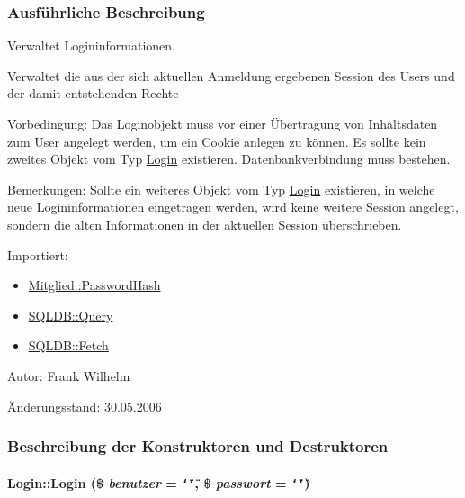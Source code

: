 \subsubsection{Ausf\"{u}hrliche Beschreibung}
Verwaltet Logininformationen. 

Verwaltet die aus der sich aktuellen Anmeldung ergebenen Session des Users und der damit entstehenden Rechte \begin{Desc}
\item[Vorbedingung:]Das Loginobjekt muss vor einer Übertragung von Inhaltsdaten zum User angelegt werden, um ein Cookie anlegen zu können. Es sollte kein zweites Objekt vom Typ \hyperlink{classLogin}{Login} existieren. Datenbankverbindung muss bestehen. \end{Desc}
\begin{Desc}
\item[Bemerkungen:]Sollte ein weiteres Objekt vom Typ \hyperlink{classLogin}{Login} existieren, in welche neue Logininformationen eingetragen werden, wird keine weitere Session angelegt, sondern die alten Informationen in der aktuellen Session überschrieben. \end{Desc}
\begin{Desc}
\item[Importiert:]\begin{itemize}
\item \hyperlink{classMitglied_9b13db80866c22bf992e73f2eb75e369}{Mitglied::Password\-Hash}\item \hyperlink{classSQLDB_fc6ffa8df50f68f07d9f5e3385b96d7a}{SQLDB::Query}\item \hyperlink{classSQLDB_a55c00ce1de0e50e0a58cae61892ba35}{SQLDB::Fetch}\end{itemize}
\end{Desc}
\begin{Desc}
\item[Autor:]Frank Wilhelm \end{Desc}
\begin{Desc}
\item[Änderungsstand:]30.05.2006 \end{Desc}




\subsubsection{Beschreibung der Konstruktoren und Destruktoren}
\hypertarget{classLogin_5d83c782459f6389f350666eb102974d}{
\paragraph[Login]{\setlength{\rightskip}{0pt plus 5cm}Login::Login (\$ {\em benutzer} = {\tt \char`\"{}\char`\"{}}, \$ {\em passwort} = {\tt \char`\"{}\char`\"{}})}\hfill}
\label{classLogin_5d83c782459f6389f350666eb102974d}


